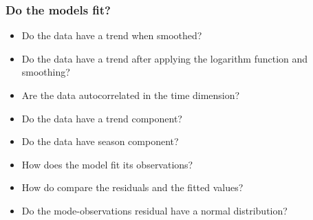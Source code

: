 \begin{frame}
  \frametitle{Do the models fit?}
  \begin{itemize}
    \item Do the data have a trend when smoothed?
    \item Do the data have a trend after applying the logarithm function and smoothing?
    \item Are the data autocorrelated in the time dimension?
    \item Do the data have a trend component?
    \item Do the data have season component?
    \item How does the model fit its observations?
    \item How do compare the residuals and the fitted values?
    \item Do the mode-observations residual have a normal distribution?
  \end{itemize}
\end{frame}
